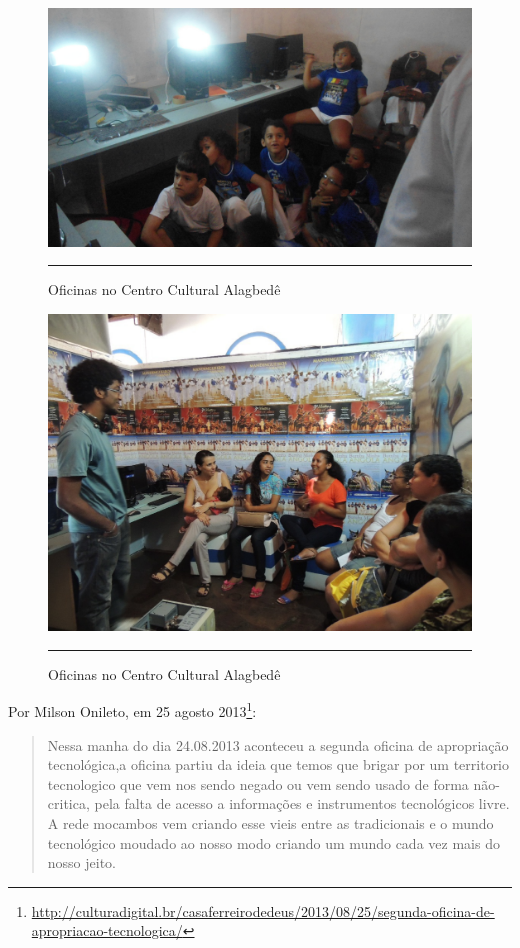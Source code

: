 \documentclass[a4paper, 11pt, oneside]{Relatorio_sem}  %
\begin{document}
\begin{figure}[htbp]
  \centering
  \includegraphics[width=\textwidth]{./Fig/Oficina_julho_MA_milson_1.pdf}
  \rule{35em}{0.5pt}
  \caption[Oficinas no Centro Cultural Alagbedê]{Oficinas no Centro Cultural Alagbedê}
  \label{fig:OficinaMA1}
\end{figure}
\begin{figure}[htbp]
  \centering
  \includegraphics[width=\textwidth]{./Fig/Oficina_julho_MA_milson_2.pdf}
  \rule{35em}{0.5pt}
  \caption[Oficinas no Centro Cultural Alagbedê]{Oficinas no Centro Cultural Alagbedê}
  \label{fig:OficinaMA2}
\end{figure}

Por Milson Onileto, em 25 agosto
2013\footnote{\url{http://culturadigital.br/casaferreirodedeus/2013/08/25/segunda-oficina-de-apropriacao-tecnologica/}}:
\begin{quotation}
  Nessa manha do dia 24.08.2013 aconteceu a segunda oficina de
  apropriação tecnológica,a oficina partiu da ideia que temos que
  brigar por um territorio tecnologico que vem nos sendo negado ou vem
  sendo usado de forma não-critica, pela falta de acesso a informações
  e instrumentos tecnológicos livre. A rede mocambos vem criando esse
  vieis entre as tradicionais e o mundo tecnológico moudado ao nosso
  modo criando um mundo cada vez mais do nosso jeito.
\end{quotation}
\end{document}
